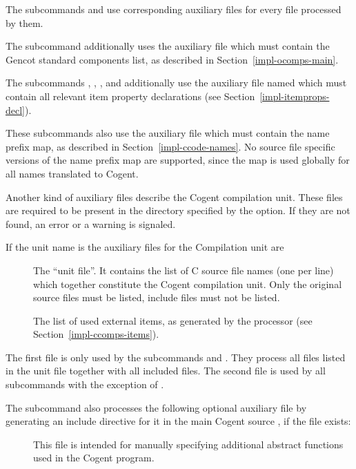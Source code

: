 The subcommands  and  use corresponding auxiliary files for every file  processed by them.

The subcommand  additionally uses the auxiliary file  which must contain the Gencot
standard components list, as described in Section~\ref{impl-ocomps-main}.

The subcommands , , , and  additionally use the auxiliary file named
 which must contain all relevant item property declarations (see Section~\ref{impl-itemprops-decl}).

These subcommands also use the auxiliary file  which must contain the name prefix map, 
as described in Section~\ref{impl-ccode-names}. No source file specific versions of the name prefix map are supported,
since the map is used globally for all names translated to Cogent.

Another kind of auxiliary files describe the Cogent compilation unit. These files are required to be present 
in the directory specified by the  option. If they are not found, an error or a warning is signaled.

If the unit name is  the auxiliary files for the Compilation unit are
\begin{description}
\item[] The ``unit file''. It contains the list of C source file names
(one per line) which together constitute the Cogent compilation unit. Only the original source files  must 
be listed, include files  must not be listed.
\item[] The list of used external items, as generated by the processor 
(see Section~\ref{impl-ccomps-items}).
\end{description}

The first file is only used by the subcommands  and . They process all files listed in the unit file
together with all included files. The second file is used by all  subcommands with the exception of .

The subcommand  also processes the following optional auxiliary file by generating an include directive for it in the 
main Cogent source , if the file exists:
\begin{description}
\item[] This file is intended for manually specifying additional abstract functions used 
in the Cogent program.
\end{description}

